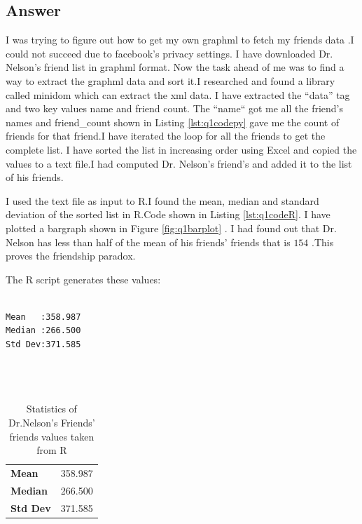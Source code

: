 \documentclass[letterpaper,11pt]{article}
\begin{document}
\newpage
\subsection*{Answer}
I was trying to figure out how to get my own graphml to fetch my friends data .I could not succeed due to facebook’s privacy settings. I have downloaded Dr. Nelson’s friend list in graphml format. Now the task ahead of me was to find a way to extract the graphml data and sort it.I researched and found a library called minidom which can extract the xml data. I have extracted the “data” tag and two key values name and friend count. The ``name`` got me all the friend’s names and friend\_count shown in Listing \ref{lst:q1codepy} gave me the count of friends for that friend.I have iterated the loop for all the friends to get the complete list. I have sorted the list in increasing order using Excel and copied the values to a text file.I had computed Dr. Nelson’s friend’s and added it to the list of his friends. 




I used the text file as input to R.I found the mean, median and standard deviation of the sorted list in R.Code shown in Listing \ref{lst:q1codeR}. I have plotted a bargraph shown in Figure \ref{fig:q1barplot} . I had found out that Dr. Nelson has less than half of the mean of his friends’ friends that is $154$ .This proves the friendship paradox.   

The R script generates these values:
\begin{lstlisting}[frame=single]

Mean   :358.987
Median :266.500
Std Dev:371.585

 
       
\end{lstlisting}
\begin{table}
\begin{tabular}{ l l }
\hline
\textbf{Mean} & 358.987 \\
\textbf{Median} & 266.500 \\
\textbf{Std Dev} & 371.585 \\
\hline
\end{tabular}
\caption{Statistics of Dr.Nelson's Friends' friends values taken from R}
\label{tab:q1statistics}
\end{table}
\end{document}
